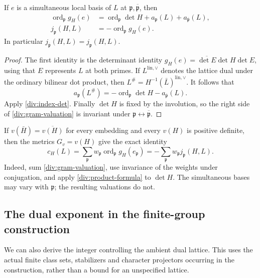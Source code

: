 \begin{lemma}\label{div:hermitian-index}
If $e$ is a simultaneous local basis of $L$ at
$\mathfrak p,\overline{\mathfrak p}$, then
\begin{align}
 \operatorname{ord}_{\mathfrak p}g_H(e)
 &=\operatorname{ord}_{\mathfrak p}\det H
       +a_{\mathfrak p}(L)+a_{\overline{\mathfrak p}}(L),
       \label{div:gram-valuation}\\
 j_{\mathfrak p}(H,L)&=-\operatorname{ord}_{\mathfrak p}g_H(e).
       \label{div:j-gram}
\end{align}
In particular $j_{\overline{\mathfrak p}}(H,L)=j_{\mathfrak p}(H,L)$.
\end{lemma}
\begin{proof}
The first identity is the determinant identity
$g_H(e)=\overline{\det E}\det H\det E$, using that $E$ represents $L$
at both primes. If $L^{\mathrm{lin},\vee}$ denotes the lattice dual
under the ordinary bilinear dot product, then
$L^\#=H^{-1}(\bar L)^{\mathrm{lin},\vee}$. It follows that
\[
 a_{\mathfrak p}(L^\#)
 =-\operatorname{ord}_{\mathfrak p}\det H
       -a_{\overline{\mathfrak p}}(L).
\]
Apply \eqref{div:index-det}. Finally $\det H$ is fixed by the
involution, so the right side of \eqref{div:gram-valuation} is invariant
under $\mathfrak p\leftrightarrow\overline{\mathfrak p}$.
\end{proof}

If $v(\bar H)=\overline{v(H)}$ for every embedding and every $v(H)$ is
positive definite, then the metrics $G_v=v(H)$ give the exact identity
\begin{equation}\label{div:rational-hermitian}
 c_H(L)=\sum_{\mathfrak p}w_{\mathfrak p}
                    \operatorname{ord}_{\mathfrak p}g_H(e_{\mathfrak p})
       =-\sum_{\mathfrak p}w_{\mathfrak p}j_{\mathfrak p}(H,L).
\end{equation}
Indeed, sum \eqref{div:gram-valuation}, use invariance of the weights
under conjugation, and apply \eqref{div:product-formula} to $\det H$.
The simultaneous bases may vary with $\mathfrak p$; the resulting
valuations do not.

\subsection{The dual exponent in the finite-group construction}

We can also derive the integer controlling the ambient dual lattice.
This uses the actual finite class sets, stabilizers and character
projectors occurring in the construction, rather than a bound for an
unspecified lattice.

